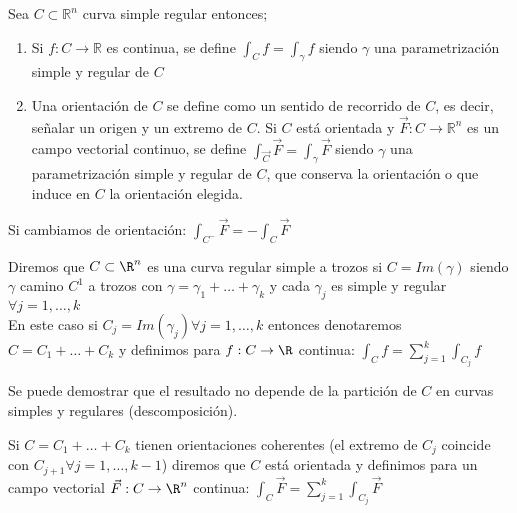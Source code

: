 \begin{definición}
    Sea $C \subset \mathbb{R}^n$ curva simple regular entonces; 
    \begin{enumerate}
        \item Si $f: C \to \mathbb{R}$ es continua, se define $\int_{C} f = \int_{\gamma} f$ siendo $\gamma$ una parametrización simple y regular de $C$
        \item Una orientación de $C$ se define como un sentido de recorrido de $C$, es decir, señalar un origen y un extremo de $C$. Si $C$ está orientada y $\vec{F}: C \to \mathbb{R}^n$ es un campo vectorial continuo, se define $\int_{\vec{C}} \vec{F} = \int_{\gamma} \vec{F}$ siendo $\gamma$ una parametrización simple y regular de $C$, que conserva la orientación o que induce en $C$ la orientación elegida. 
    \end{enumerate}
\end{definición}

\begin{observación}
    Si cambiamos de orientación: $\int_{C^-} \vec{F} = -\int_{C} \vec{F}$
\end{observación}

\begin{definición}
    Diremos que $C \subset \R^n $ es una curva regular simple a trozos si $C = Im(\gamma)$ siendo $\gamma$ camino $C^1$ a trozos con $\gamma = \gamma_1 + \ldots + \gamma_k$ y cada $\gamma_j$ es simple y regular $\forall j = 1, \ldots, k$\\
    En este caso si $C_j = Im(\gamma_j) \forall j = 1, \ldots, k$ entonces denotaremos $C = C_1 + \ldots + C_k$ y definimos para $f: C \to \R$ continua: $\int_{C} f = \sum_{j=1}^{k} \int_{C_j} f$
\end{definición}

\begin{observación}
    Se puede demostrar que el resultado no depende de la partición de $C$ en curvas simples y regulares (descomposición).
\end{observación}

\begin{observación}
    Si $C = C_1 + \ldots + C_k$ tienen orientaciones coherentes (el extremo de $C_j$ coincide con $C_{j+1} \forall j = 1, \ldots, k-1$) diremos que $C$ está orientada y definimos para un campo vectorial $\vec{F}: C \to \R^n$ continua: $\int_{C} \vec{F} = \sum_{j=1}^{k} \int_{C_j} \vec{F}$
\end{observación}

